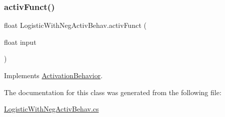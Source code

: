 \subsubsection{\texorpdfstring{activ\+Funct()}{activFunct()}}
{\footnotesize\ttfamily float Logistic\+With\+Neg\+Activ\+Behav.\+activ\+Funct (\begin{DoxyParamCaption}\item[{float}]{input }\end{DoxyParamCaption})}



Implements \mbox{\hyperlink{interface_activation_behavior_a6c7af51cf1b10eaadcbf086231e5539b}{Activation\+Behavior}}.



The documentation for this class was generated from the following file\+:\begin{DoxyCompactItemize}
\item 
\mbox{\hyperlink{_logistic_with_neg_activ_behav_8cs}{Logistic\+With\+Neg\+Activ\+Behav.\+cs}}\end{DoxyCompactItemize}
